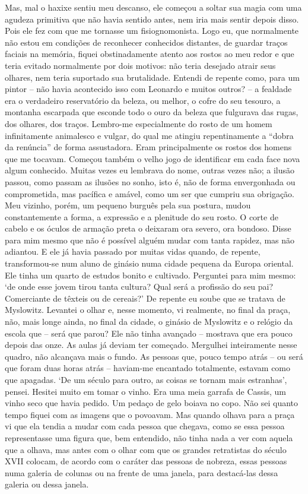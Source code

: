 Mas, mal o haxixe sentiu meu descanso, ele começou a soltar sua magia
com uma agudeza primitiva que não havia sentido antes, nem iria mais
sentir depois disso. Pois ele fez com que me tornasse um
fisiognomonista. Logo eu, que normalmente não estou em condições de
reconhecer conhecidos distantes, de guardar traços faciais na memória,
fiquei obstinadamente atento aos rostos ao meu redor e que teria evitado
normalmente por dois motivos: não teria desejado atrair seus olhares,
nem teria suportado sua brutalidade. Entendi de repente como, para um
pintor -- não havia acontecido isso com Leonardo e muitos outros? -- a
fealdade era o verdadeiro reservatório da beleza, ou melhor, o cofre do
seu tesouro, a montanha escarpada que esconde todo o ouro da beleza que
fulgurava das rugas, dos olhares, dos traços. Lembro-me especialmente do
rosto de um homem infinitamente animalesco e vulgar, do qual me atingiu
repentinamente a ``dobra da renúncia'' de forma assustadora. Eram
principalmente os rostos dos homens que me tocavam. Começou também o
velho jogo de identificar em cada face nova algum conhecido. Muitas
vezes eu lembrava do nome, outras vezes não; a ilusão passou, como
passam as ilusões no sonho, isto é, não de forma envergonhada ou
comprometida, mas pacífica e amável, como um ser que cumpriu sua
obrigação. Meu vizinho, porém, um pequeno burguês pela sua postura,
mudou constantemente a forma, a expressão e a plenitude do seu rosto. O
corte de cabelo e os óculos de armação preta o deixaram ora severo, ora
bondoso. Disse para mim mesmo que não é possível alguém mudar com tanta
rapidez, mas não adiantou. E ele já havia passado por muitas vidas
quando, de repente, transformou-se num aluno de ginásio numa cidade
pequena da Europa oriental. Ele tinha um quarto de estudos bonito e
cultivado. Perguntei para mim mesmo: `de onde esse jovem tirou tanta
cultura? Qual será a profissão do seu pai? Comerciante de têxteis ou de
cereais?' De repente eu soube que se tratava de Myslowitz. Levantei o
olhar e, nesse momento, vi realmente, no final da praça, não, mais longe
ainda, no final da cidade, o ginásio de Myslowitz e o relógio da escola
que -- será que parou? Ele não tinha avançado -- mostrava que era pouco
depois das onze. As aulas já deviam ter começado. Mergulhei inteiramente
nesse quadro, não alcançava mais o fundo. As pessoas que, pouco tempo
atrás -- ou será que foram duas horas atrás -- haviam-me encantado
totalmente, estavam como que apagadas. `De um século para outro, as
coisas se tornam mais estranhas', pensei. Hesitei muito em tomar o
vinho. Era uma meia garrafa de Cassis, um vinho seco que havia pedido.
Um pedaço de gelo boiava no copo. Não sei quanto tempo fiquei com as
imagens que o povoavam. Mas quando olhava para a praça vi que ela tendia
a mudar com cada pessoa que chegava, como se essa pessoa representasse
uma figura que, bem entendido, não tinha nada a ver com aquela que a
olhava, mas antes com o olhar com que os grandes retratistas do século
XVII colocam, de acordo com o caráter das pessoas de nobreza, essas
pessoas numa galeria de colunas ou na frente de uma janela, para
destacá-las dessa galeria ou dessa janela.

